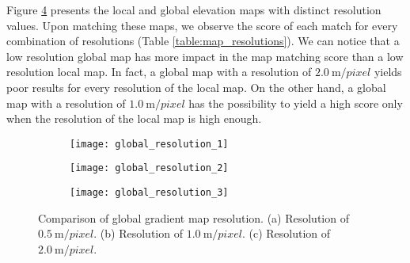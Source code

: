 Figure \ref{fig:global_map_resolution} presents the local and global elevation
maps with distinct resolution values.
Upon matching these maps, we observe the score of each match for every
combination of resolutions (Table \ref{table:map_resolutions}).
We can notice that a low resolution global map has more impact in the map
matching score than a low resolution local map.
In fact, a global map with a resolution of $\SI{2.0}{\m \per pixel}$ yields
poor results for every resolution of the local map.
On the other hand, a global map with a resolution of $\SI{1.0}{\m \per pixel}$
has the possibility to yield a high score only when the resolution of
the local map is high enough.

\begin{figure}[h!]
    \centering
    \begin{subfigure}{0.5\textwidth}
        \centering
        \texttt{[image: global\_resolution\_1]}
        \caption{}
        \label{fig:global_resolution_1}
    \end{subfigure}
    \begin{subfigure}{0.5\textwidth}
        \centering
        \texttt{[image: global\_resolution\_2]}
        \caption{}
        \label{fig:global_resolution_2}
    \end{subfigure}%
    \begin{subfigure}{0.5\textwidth}
        \centering
        \texttt{[image: global\_resolution\_3]}
        \caption{}
        \label{fig:global_resolution_3}
    \end{subfigure}
    \caption[Global map resolution comparison]{Comparison of global gradient
        map resolution.
        (a) Resolution of $\SI{0.5}{\m \per pixel}$.
        (b) Resolution of $\SI{1.0}{\m \per pixel}$.
        (c) Resolution of $\SI{2.0}{\m \per pixel}$.
        }
    \label{fig:global_map_resolution}
\end{figure}

